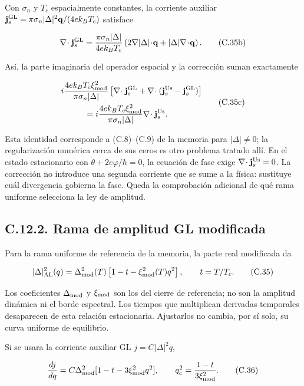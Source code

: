 \documentclass[
  spanish,
  10pt,
  a4paper,
]{article}
\begin{document}
Con \(\sigma_n\) y \(T_c\) espacialmente constantes, la corriente
auxiliar
\(\mathbf j_s^{\rm GL}=\pi\sigma_n|\Delta|^2\mathbf q/(4ek_BT_c)\)
satisface

\[
\nabla\!\cdot\mathbf j_s^{\rm GL}
=\frac{\pi\sigma_n|\Delta|}{4ek_BT_c}
\left(2\nabla|\Delta|\!\cdot\!\mathbf q
+|\Delta|\nabla\!\cdot\!\mathbf q\right).
\tag{C.35b}
\]

Así, la parte imaginaria del operador espacial y la corrección suman
exactamente

\[
\begin{aligned}
&i\frac{4ek_BT_c\xi_{\rm mod}^2}{\pi\sigma_n|\Delta|}
\left[\nabla\!\cdot\mathbf j_s^{\rm GL}
+\nabla\!\cdot(\mathbf j_s^{\rm Us}-\mathbf j_s^{\rm GL})\right]\\
&\hspace{1cm}=
i\frac{4ek_BT_c\xi_{\rm mod}^2}{\pi\sigma_n|\Delta|}
\nabla\!\cdot\mathbf j_s^{\rm Us}.
\end{aligned}
\tag{C.35c}
\]

Esta identidad corresponde a (C.8)--(C.9) de la memoria para
\(|\Delta|\ne0\); la regularización numérica cerca de sus ceros es otro
problema tratado allí. En el estado estacionario con
\(\dot\theta+2e\varphi/\hbar=0\), la ecuación de fase exige
\(\nabla\!\cdot\mathbf j_s^{\rm Us}=0\). La corrección no introduce una
segunda corriente que se sume a la física: sustituye cuál divergencia
gobierna la fase. Queda la comprobación adicional de qué rama uniforme
selecciona la ley de amplitud.

\subsection{C.12.2. Rama de amplitud GL
modificada}\label{c.12.2.-rama-de-amplitud-gl-modificada}

Para la rama uniforme de referencia de la memoria, la parte real
modificada da

\[
|\Delta|_{\rm AL}^2(q)
=\Delta_{\rm mod}^2(T)
\left[1-t-\xi_{\rm mod}^2(T)q^2\right],\qquad t=T/T_c.
\tag{C.35}
\]

Los coeficientes \(\Delta_{\rm mod}\) y \(\xi_{\rm mod}\) son los del
cierre de referencia; no son la amplitud dinámica ni el borde espectral.
Los tiempos que multiplican derivadas temporales desaparecen de esta
relación estacionaria. Ajustarlos no cambia, por sí solo, su curva
uniforme de equilibrio.

Si se usara la corriente auxiliar GL \(j=C|\Delta|^2q\),

\[
\frac{dj}{dq}=C\Delta_{\rm mod}^2
[1-t-3\xi_{\rm mod}^2q^2],
\qquad q_c^2=\frac{1-t}{3\xi_{\rm mod}^2}.
\tag{C.36}
\]
\end{document}
